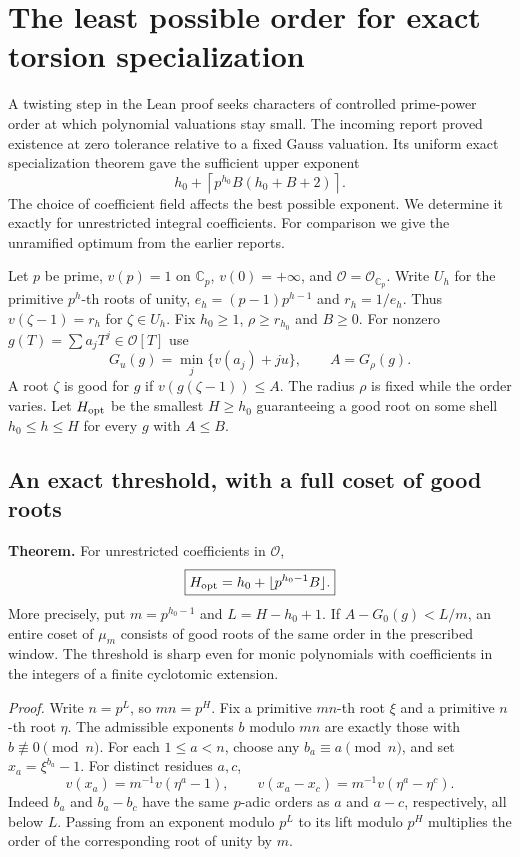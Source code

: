 \section{The least possible order for exact torsion specialization}
\label{sec:optimal-torsion}
A twisting step in the Lean proof seeks characters of controlled prime-power order at which polynomial valuations stay small. The incoming report  proved existence at zero tolerance relative to a fixed Gauss valuation. Its uniform exact specialization theorem gave the sufficient upper exponent
\[
  h_0+\left\lceil p^{h_0}B(h_0+B+2)\right\rceil .
\]
The choice of coefficient field affects the best possible exponent. We determine it exactly for unrestricted integral coefficients. For comparison we give the unramified optimum from the earlier reports.

Let $p$ be prime, $v(p)=1$ on $\mathbb C_p$, $v(0)=+\infty$, and $\mathcal O=\mathcal O_{\mathbb C_p}$. Write $U_h$ for the primitive $p^h$-th roots of unity, $e_h=(p-1)p^{h-1}$ and $r_h=1/e_h$. Thus $v(\zeta-1)=r_h$ for $\zeta\in U_h$. Fix $h_0\ge1$, $\rho\ge r_{h_0}$ and $B\ge0$. For nonzero $g(T)=\sum a_jT^j\in\mathcal O[T]$ use
\[
       G_u(g)=\min_j\{v(a_j)+ju\},\qquad A=G_\rho(g).
\]
A root $\zeta$ is good for $g$ if $v(g(\zeta-1))\le A$. The radius $\rho$ is fixed while the order varies. Let $H_{\rm opt}$ be the smallest $H\ge h_0$ guaranteeing a good root on some shell $h_0\le h\le H$ for every $g$ with $A\le B$.

\subsection{An exact threshold, with a full coset of good roots}
\noindent\textbf{Theorem.}
For unrestricted coefficients in $\mathcal O$,
\[
                   \boxed{H_{\rm opt}=h_0+\lfloor p^{h_0-1}B\rfloor.}
\]
More precisely, put $m=p^{h_0-1}$ and $L=H-h_0+1$. If $A-G_0(g)<L/m$, an entire coset of $\mu_m$ consists of good roots of the same order in the prescribed window. The threshold is sharp even for monic polynomials with coefficients in the integers of a finite cyclotomic extension.

\medskip\noindent\emph{Proof.}
Write $n=p^L$, so $mn=p^H$. Fix a primitive $mn$-th root $\xi$ and a primitive $n$-th root $\eta$. The admissible exponents $b$ modulo $mn$ are exactly those with $b\not\equiv0\pmod n$. For each $1\le a<n$, choose any $b_a\equiv a\pmod n$, and set $x_a=\xi^{b_a}-1$. For distinct residues $a,c$,
\[
 v(x_a)=m^{-1}v(\eta^a-1),\qquad
 v(x_a-x_c)=m^{-1}v(\eta^a-\eta^c).
\]
Indeed $b_a$ and $b_a-b_c$ have the same $p$-adic orders as $a$ and $a-c$, respectively, all below $L$. Passing from an exponent modulo $p^L$ to its lift modulo $p^H$ multiplies the order of the corresponding root of unity by $m$.

